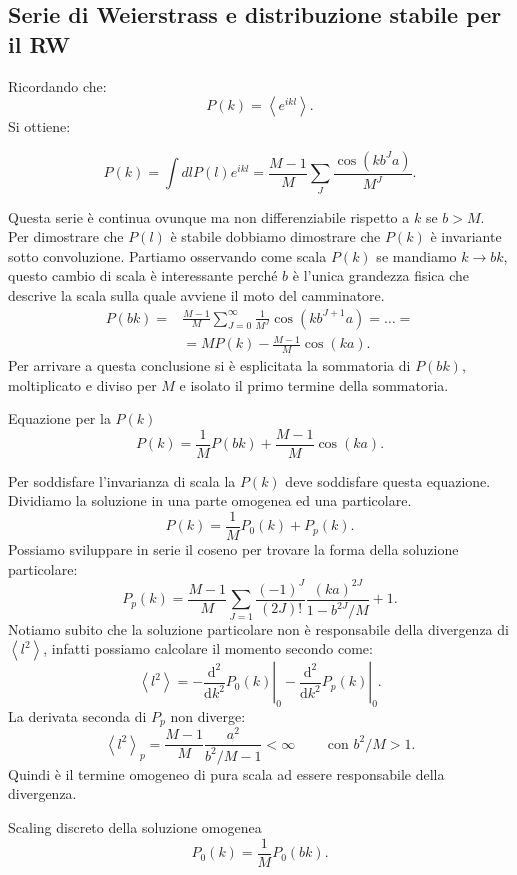 \subsection{Serie di Weierstrass e distribuzione stabile per il RW}%
\label{sub:Serie di Weierstrass e distribuzione stabile per il RW}
Ricordando che:
\[
    P(k) = \left<e^{ikl}\right>
.\] 
Si ottiene:
\begin{redbox}{}
\[
    P(k)  = \int dl P(l) e^{ikl} = \frac{M-1}{M} \sum_{J}^{} \frac{\cos (kb^Ja) }{M^J}
.\]    
\end{redbox}
\noindent
Questa serie è continua ovunque ma non differenziabile rispetto a $k$ se $b>M$.\\
Per dimostrare che $P(l)$ è stabile dobbiamo dimostrare che $P(k)$ è invariante sotto convoluzione. Partiamo osservando come scala $P(k)$ se mandiamo $k\to bk$, questo cambio di scala è interessante perché $b$ è l'unica grandezza fisica che descrive la scala sulla quale avviene il moto del camminatore. 
\[\begin{aligned}
    P(bk) =& \frac{M-1}{M}\sum_{J=0}^{\infty} \frac{1}{M^{J}}\cos (kb^{J+1}a) =\ldots=\\
	   & = M P(k) - \frac{M-1}{M}\cos (ka) 
.\end{aligned}\]
Per arrivare a questa conclusione si è esplicitata la sommatoria di $P(bk)$, moltiplicato e diviso per $M$ e isolato il primo termine della sommatoria.
\begin{redbox}{Equazione per la $P(k)$}
\[
    P(k) = \frac{1}{M}P(bk) + \frac{M-1}{M}\cos (ka) 
.\]     
\end{redbox}
\noindent
Per soddisfare l'invarianza di scala la $P(k)$ deve soddisfare questa equazione. Dividiamo la soluzione in una parte omogenea ed una particolare.
\[
    P(k) = \frac{1}{M}P_0(k) + P_p(k) 
.\] 
Possiamo sviluppare in serie il coseno per trovare la forma della soluzione particolare:
\[
    P_p(k) = \frac{M-1}{M} \sum_{J=1}^{} \frac{(-1)^{J}}{\left(2J\right)!} \frac{(ka)^{2J}}{1-b^{2J} /M} + 1
.\] 
Notiamo subito che la soluzione particolare non è responsabile della divergenza di $\left<l^2\right>$, infatti possiamo calcolare il momento secondo come:
\[
    \left<l^2\right> = - \left.\frac{\text{d} ^2}{\text{d} k^2} P_0(k)\right|_{0}- \left.\frac{\text{d} ^2}{\text{d} k^2} P_p(k)\right|_{0}  
.\] 
La derivata seconda di $P_p$ non diverge:
\[
     \left<l^2\right>_p = \frac{M-1}{M} \frac{a^2}{b^2 /M - 1} < \infty \qquad \text{ con }b^2 /M > 1
.\] 
Quindi è il termine omogeneo di pura scala ad essere responsabile della divergenza.
\begin{greenbox}{Scaling discreto della soluzione omogenea}
\[
    P_0(k) = \frac{1}{M}P_0(bk) 
.\]    
\end{greenbox}
